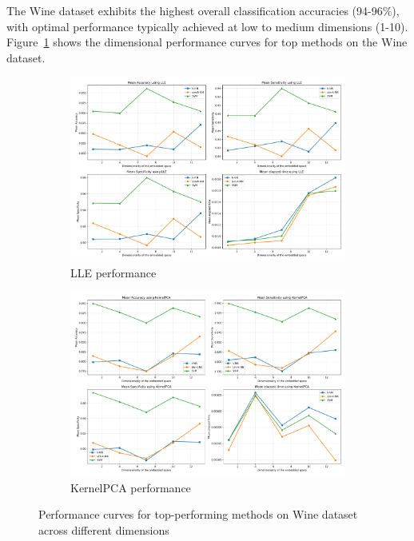 \documentclass[review]{elsarticle}
\begin{document}
The Wine dataset exhibits the highest overall classification accuracies (94-96\%), with optimal performance typically achieved at low to medium dimensions (1-10). Figure~\ref{fig:wine_performance} shows the dimensional performance curves for top methods on the Wine dataset.

\begin{figure}[h]
\centering
\begin{subfigure}[b]{0.48\textwidth}
\includegraphics[width=\textwidth]{../python/results/plots/Mean_Results_LLE_Data_Wine.pdf}
\caption{LLE performance}
\end{subfigure}
\hfill
\begin{subfigure}[b]{0.48\textwidth}
\includegraphics[width=\textwidth]{../python/results/plots/Mean_Results_KernelPCA_Data_Wine.pdf}
\caption{KernelPCA performance}
\end{subfigure}
\caption{Performance curves for top-performing methods on Wine dataset across different dimensions}
\label{fig:wine_performance}
\end{figure}
\end{document}
